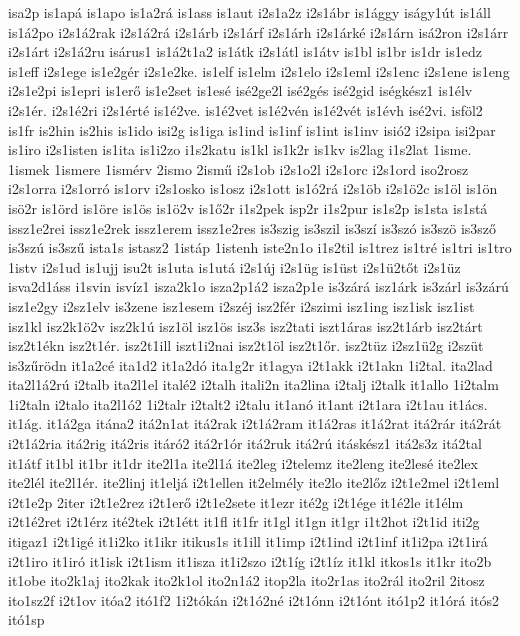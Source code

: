 {isa2p
is1apá
is1apo
is1a2rá
is1ass
is1aut
i2s1a2z
i2s1ábr
is1ággy
iságy1út
is1áll
is1á2po
i2s1á2rak
i2s1á2rá
i2s1árb
i2s1árf
i2s1árh
i2s1árké
i2s1árn
isá2ron
i2s1árr
i2s1árt
i2s1á2ru
isárus1
is1á2t1a2
is1átk
i2s1átl
is1átv
is1bl
is1br
is1dr
is1edz
is1eff
i2s1ege
is1e2gér
i2s1e2ke.
is1elf
is1elm
i2s1elo
i2s1eml
i2s1enc
i2s1ene
is1eng
i2s1e2pi
is1epri
is1erő
is1e2set
is1esé
isé2ge2l
isé2gés
isé2gid
iségkész1
is1élv
i2s1ér.
i2s1é2ri
i2s1érté
is1é2ve.
is1é2vet
is1é2vén
is1é2vét
is1évh
isé2vi.
isföl2
is1fr
is2hin
is2his
is1ido
isi2g
is1iga
is1ind
is1inf
is1int
is1inv
isió2
i2sipa
isi2par
is1iro
i2s1isten
is1ita
is1i2zo
i1s2katu
is1kl
is1k2r
is1kv
is2lag
i1s2lat
1isme.
1ismek
1ismere
1ismérv
2ismo
2ismű
i2s1ob
i2s1o2l
i2s1orc
i2s1ord
iso2rosz
i2s1orra
i2s1orró
is1orv
i2s1osko
is1osz
i2s1ott
is1ó2rá
i2s1öb
i2s1ö2c
is1öl
is1ön
isö2r
is1örd
is1öre
is1ös
is1ö2v
is1ő2r
i1s2pek
isp2r
i1s2pur
is1s2p
is1sta
is1stá
issz1e2rei
issz1e2rek
issz1erem
issz1e2res
is3szig
is3szil
is3szí
is3szó
is3szö
is3sző
is3szú
is3szű
ista1s
istasz2
1istáp
1istenh
iste2n1o
i1s2til
is1trez
is1tré
is1tri
is1tro
1istv
i2s1ud
is1ujj
isu2t
is1uta
is1utá
i2s1új
i2s1üg
is1üst
i2s1ü2tőt
i2s1üz
isva2d1áss
i1svin
isvíz1
isza2k1o
isza2p1á2
isza2p1e
is3zárá
isz1árk
is3zárl
is3zárú
isz1e2gy
i2sz1elv
is3zene
isz1esem
i2széj
isz2fér
i2szimi
isz1ing
isz1isk
isz1ist
isz1kl
isz2k1ö2v
isz2k1ú
isz1öl
isz1ös
isz3s
isz2tati
iszt1áras
isz2t1árb
isz2tárt
isz2t1ékn
isz2t1ér.
isz2t1ill
iszt1i2nai
isz2t1öl
isz2t1őr.
isz2tüz
i2sz1ü2g
i2szüt
is3zűrödn
it1a2cé
ita1d2
it1a2dó
ita1g2r
it1agya
i2t1akk
i2t1akn
1i2tal.
ita2lad
ita2l1á2rú
i2talb
ita2l1el
italé2
i2talh
itali2n
ita2lina
i2talj
i2talk
it1allo
1i2talm
1i2taln
i2talo
ita2l1ó2
1i2talr
i2talt2
i2talu
it1anó
it1ant
i2t1ara
i2t1au
it1ács.
it1ág.
it1á2ga
itána2
itá2n1at
itá2rak
i2t1á2ram
it1á2ras
it1á2rat
itá2rár
itá2rát
i2t1á2ria
itá2rig
itá2ris
itáró2
itá2r1ór
itá2ruk
itá2rú
itáskész1
itá2s3z
itá2tal
it1átf
it1bl
it1br
it1dr
ite2l1a
ite2l1á
ite2leg
i2telemz
ite2leng
ite2lesé
ite2lex
ite2lél
ite2l1ér.
ite2linj
it1eljá
i2t1ellen
it2elmély
ite2lo
ite2lőz
i2t1e2mel
i2t1eml
i2t1e2p
2iter
i2t1e2rez
i2t1erő
i2t1e2sete
it1ezr
ité2g
i2t1ége
it1é2le
it1élm
i2t1é2ret
i2t1érz
ité2tek
i2t1étt
it1fl
it1fr
it1gl
it1gn
it1gr
i1t2hot
i2t1id
iti2g
itigaz1
i2t1igé
it1i2ko
it1ikr
itikus1s
it1ill
it1imp
i2t1ind
i2t1inf
it1i2pa
i2t1irá
i2t1iro
it1iró
it1isk
i2t1ism
it1isza
it1i2szo
i2t1íg
i2t1íz
it1kl
itkos1s
it1kr
ito2b
it1obe
ito2k1aj
ito2kak
ito2k1ol
ito2n1á2
itop2la
ito2r1as
ito2rál
ito2ril
2itosz
ito1sz2f
i2t1ov
itóa2
itó1f2
1i2tókán
i2t1ó2né
i2t1ónn
i2t1ónt
itó1p2
it1órá
itós2
itó1sp
}

